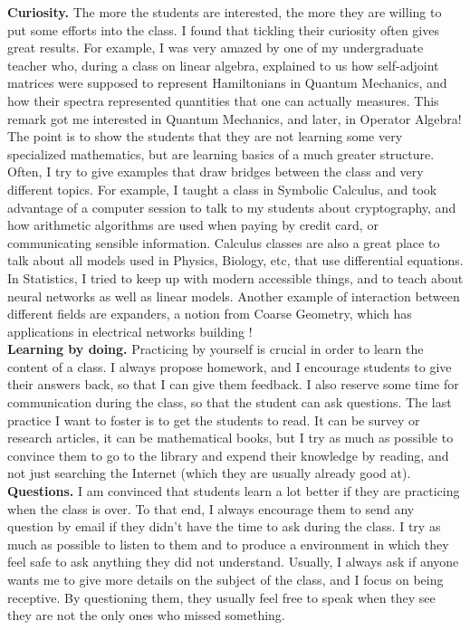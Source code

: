 \documentclass[a4paper]{article}
\begin{document}
\textbf{Curiosity.} The more the students are interested, the more they are willing to put some efforts into the class. I found that tickling their curiosity often gives great results. For example, I was very amazed by one of my undergraduate teacher who, during a class on linear algebra, explained to us how self-adjoint matrices were supposed to represent Hamiltonians in Quantum Mechanics, and how their spectra represented quantities that one can actually measures. This remark got me interested in Quantum Mechanics, and later, in Operator Algebra! The point is to show the students that they are not learning some very specialized mathematics, but are learning basics of a much greater structure. Often, I try to give examples that draw bridges between the class and very different topics. For example, I taught a class in Symbolic Calculus, and took advantage of a computer session to talk to my students about cryptography, and how arithmetic algorithms are used when paying by credit card, or communicating sensible information. Calculus classes are also a great place to talk about all models used in Physics, Biology, etc, that use differential equations. In Statistics, I tried to keep up with modern accessible things, and to teach about neural networks as well as linear models. Another example of interaction between different fields are expanders, a notion from Coarse Geometry, which has applications in electrical networks building !\\

\textbf{Learning by doing.} Practicing by yourself is crucial in order to learn the content of a class. I always propose homework, and I encourage students to give their answers back, so that I can give them feedback. I also reserve some time for communication during the class, so that the student can ask questions. The last practice I want to foster is to get the students to read. It can be survey or research articles, it can be mathematical books, but I try as much as possible to convince them to go to the library and expend their knowledge by reading, and not just searching the Internet (which they are usually already good at). \\

\textbf{Questions.} I am convinced that students learn a lot better if they are practicing when the class is over. To that end, I always encourage them to send any question by email if they didn’t have the time to ask during the class. I try as much as possible to listen to them and to produce a environment in which they feel safe to ask anything they did not understand. Usually, I always ask if anyone wants me to give more details on the subject of the class, and I focus on being receptive. By questioning them, they usually feel free to speak when they see they are not the only ones who missed something.\\
\end{document}
